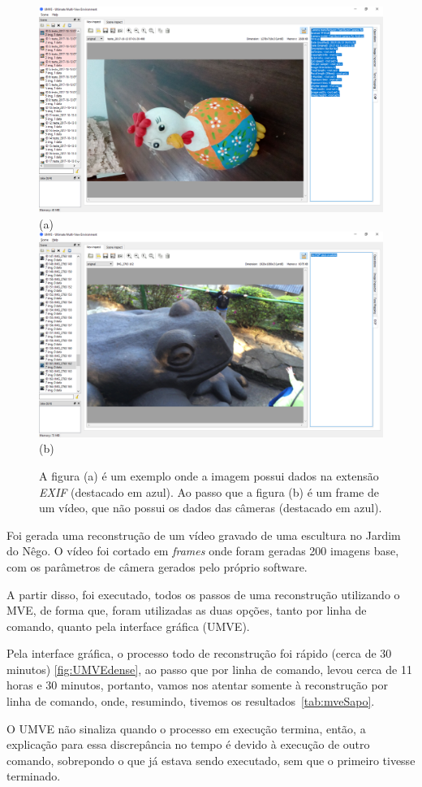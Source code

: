 \begin{figure}[!h]
	\centering
	\includegraphics[width=0.5\linewidth]{figs/exifumve.png}(a)
	\includegraphics[width=0.5\linewidth]{figs/exifsemumve.png}(b)
	\caption{%
	A figura (a) é um exemplo onde a imagem possui dados na extensão \emph{EXIF} (destacado em azul). Ao passo que a figura (b) é um frame de um vídeo, que não possui os dados das câmeras (destacado em azul).
	}\label{fig:mveexif}
\end{figure} 

Foi gerada uma reconstrução de um vídeo gravado de uma escultura no Jardim do Nêgo. O  vídeo foi cortado em \emph{frames} onde foram geradas 200 imagens base, com os parâmetros de câmera gerados pelo próprio software. 

A partir disso, foi executado, todos os passos de uma reconstrução utilizando o MVE, de forma que, foram utilizadas as duas opções, tanto por linha de comando, quanto pela interface gráfica (UMVE).

Pela interface gráfica, o processo todo de reconstrução foi rápido (cerca de 30 minutos) \ref{fig:UMVEdense}, ao passo que por linha de comando, levou cerca de 11 horas e 30 minutos, portanto, vamos nos atentar somente à reconstrução por linha de comando, onde, resumindo, tivemos os resultados~\ref{tab:mveSapo}. 

O UMVE não sinaliza quando o processo em execução termina, então, a explicação para essa discrepância no tempo é devido à execução de outro comando, sobrepondo o que já estava sendo executado, sem que o primeiro tivesse terminado.

